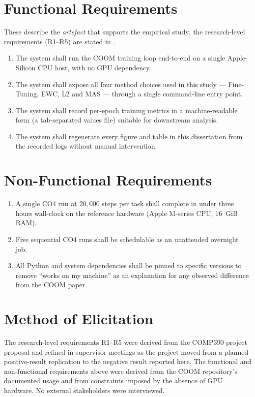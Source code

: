 \section{Functional Requirements}

These describe the \emph{artefact} that supports the empirical study;
the research-level requirements (R1--R5) are stated in
.

\begin{enumerate}[label=\textbf{FR\arabic*.},leftmargin=2.6em]
    \item \label{fr:run}
        The system shall run the COOM training loop end-to-end on a
        single Apple-Silicon CPU host, with no GPU dependency.
    \item \label{fr:methods}
        The system shall expose all four method choices used in this
        study --- Fine-Tuning, EWC, L2 and MAS --- through a single
        command-line entry point.
    \item \label{fr:logs}
        The system shall record per-epoch training metrics in a
        machine-readable form (a tab-separated values file) suitable
        for downstream analysis.
    \item \label{fr:reproduce}
        The system shall regenerate every figure and table in this
        dissertation from the recorded logs without manual
        intervention.
\end{enumerate}

\section{Non-Functional Requirements}

\begin{enumerate}[label=\textbf{NFR\arabic*.},leftmargin=3em]
    \item \label{nfr:wallclock}
        A single CO4 run at $20{,}000$ steps per task shall complete
        in under three hours wall-clock on the reference hardware
        (Apple M-series CPU, 16~GiB RAM).
    \item \label{nfr:queue}
        Five sequential CO4 runs shall be schedulable as an
        unattended overnight job.
    \item \label{nfr:dependencies}
        All Python and system dependencies shall be pinned to
        specific versions to remove ``works on my machine'' as an
        explanation for any observed difference from the COOM paper.
\end{enumerate}

\section{Method of Elicitation}

The research-level requirements R1--R5 were derived from the COMP390
project proposal and refined in supervisor meetings as the project
moved from a planned positive-result replication to the negative
result reported here. The functional and non-functional requirements
above were derived from the COOM repository's documented usage and
from constraints imposed by the absence of GPU hardware. No external
stakeholders were interviewed.
